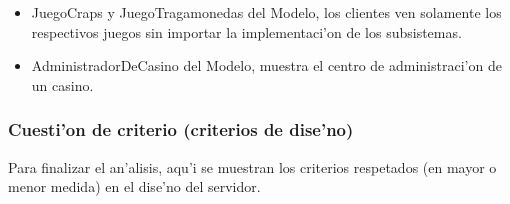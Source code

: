 \begin{description}
\begin{itemize}
	\item JuegoCraps y JuegoTragamonedas del Modelo, los clientes ven solamente los respectivos juegos sin importar la implementaci'on de los subsistemas.
	\item AdministradorDeCasino del Modelo, muestra el centro de administraci'on de un casino.
	\end{itemize}
\end{description}



\subsubsection{Cuesti'on de criterio (criterios de dise'no)}
Para finalizar el an'alisis, aqu'i se muestran los criterios respetados (en mayor o menor medida) en el dise'no del servidor.

